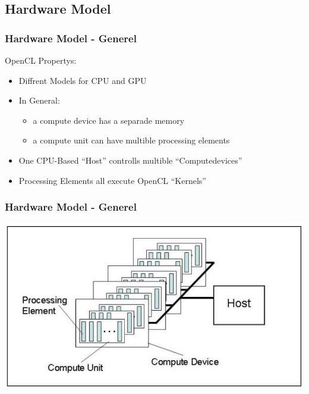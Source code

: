 \documentclass{beamer}
\begin{document}
\subsection{Hardware Model}
\begin{frame}
    \frametitle{Hardware Model - Generel}
    OpenCL Propertys:
    \begin{itemize}
     \item Diffrent Models for CPU and GPU
     \item In General:
     \begin{itemize}
      \item a compute device has a separade memory
      \item a compute unit can have multible processing elements 
     \end{itemize}
     \item One CPU-Based ``Host'' controlls multible ``Computedevices''
     \item Processing Elements all execute OpenCL ``Kernels''
    \end{itemize}
\end{frame}
\begin{frame}
    \frametitle{Hardware Model - Generel}
    \includegraphics[width=\textwidth]{res/KhronosPlatformModel.png}
\end{frame}
\end{document}
